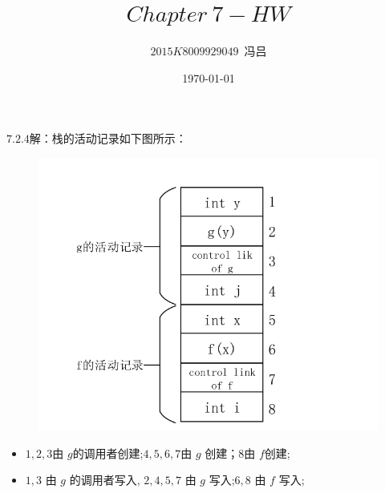 \documentclass[UTF8,noindent]{ctexart}
\title{$Chapter\ 7-HW$}
\author{$2015K8009929049$\ 冯吕}
\date{\today}
\begin{document}
\maketitle
{}
$7.2.4$解：栈的活动记录如下图所示：
\begin{figure}[H]
  \centering
  \includegraphics[scale = 0.4]{./fig/7-2-4.png}
\end{figure}

\begin{itemize}
  \item 	$1,2,3 $由 $g $的调用者创建;$4,5,6,7 $由 $g$ 创建；$8 $由 $f $创建;
  \item $1,3$ 由 $g$ 的调用者写入, $2,4,5,7$ 由 $g$ 写入;$6,8$ 由 $f$ 写入;
\end{itemize}
\end{document}
